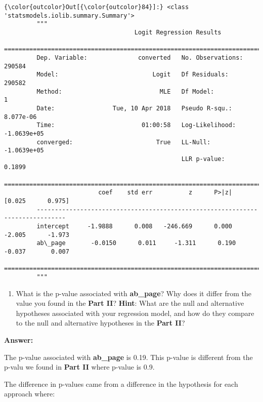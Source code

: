 \documentclass[11pt]{article}
\providecommand{\tightlist}{%
      \setlength{\itemsep}{0pt}\setlength{\parskip}{0pt}}
\begin{document}
\begin{Verbatim}[commandchars=\\\{\}]
{\color{outcolor}Out[{\color{outcolor}84}]:} <class 'statsmodels.iolib.summary.Summary'>
         """
                                    Logit Regression Results                           
         ==============================================================================
         Dep. Variable:              converted   No. Observations:               290584
         Model:                          Logit   Df Residuals:                   290582
         Method:                           MLE   Df Model:                            1
         Date:                Tue, 10 Apr 2018   Pseudo R-squ.:               8.077e-06
         Time:                        01:00:58   Log-Likelihood:            -1.0639e+05
         converged:                       True   LL-Null:                   -1.0639e+05
                                                 LLR p-value:                    0.1899
         ==============================================================================
                          coef    std err          z      P>|z|      [0.025      0.975]
         ------------------------------------------------------------------------------
         intercept     -1.9888      0.008   -246.669      0.000      -2.005      -1.973
         ab\_page       -0.0150      0.011     -1.311      0.190      -0.037       0.007
         ==============================================================================
         """
\end{Verbatim}
            
    \begin{enumerate}
\def\labelenumi{\alph{enumi}.}
\setcounter{enumi}{4}
\tightlist
\item
  What is the p-value associated with \textbf{ab\_page}? Why does it
  differ from the value you found in the \textbf{Part II}?
  \textbf{Hint}: What are the null and alternative hypotheses associated
  with your regression model, and how do they compare to the null and
  alternative hypotheses in the \textbf{Part II}?
\end{enumerate}

    \textbf{Answer:}

The p-value associated with \textbf{ab\_page} is 0.19. This p-value is
different from the p-valu we found in \textbf{Part II} where p-value is
0.9.

The difference in p-values came from a difference in the hypothesis for
each approach where:
\end{document}
